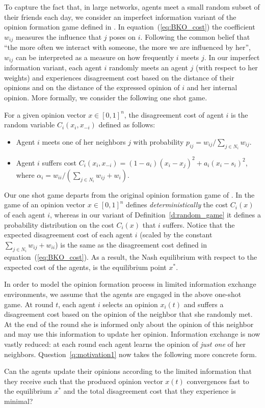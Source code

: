 To capture the fact that, in large networks, agents meet a small random subset
of their friends each day, we consider an imperfect information variant of the
opinion formation game defined in \cite{BKO11}. In equation~(\ref{eq:BKO_cost})
the coefficient $w_{ij}$ measures the influence that $j$ poses on $i$.
Following the common belief that \enquote{the more often we interact with
  someone, the more we are influenced by her}, $w_{ij}$ can be interpreted as a
measure on how frequently $i$ meets $j$. In our imperfect information variant,
each agent $i$ randomly meets an agent $j$ (with respect to her weights) and
experiences disagreement cost based on the distance of their opinions and on
the distance of the expressed opinion of $i$ and her internal opinion.  More
formally, we consider the following one shot game.
%
\begin{definition}\label{d:random_game}
  For a given opinion vector $x \in [0,1]^n$, the disagreement cost of agent
  $i$ is the random variable $C_i(x_i,x_{-i})$ defined as follows:
  \begin{itemize}
    \item Agent $i$ meets one of her neighbors $j$ with probability $p_{ij}=
      w_{ij}/\sum_{j\in N_i}w_{ij}$.
    \item Agent $i$ suffers cost $C_i(x_i , x_{-i}) = (1-a_i)(x_i-x_j)^2 +
      a_i(x_i-s_i)^2$, where $\alpha_i = w_{ii}/(\sum_{j\in N_i}w_{ij}+w_i)$.
  \end{itemize}
\end{definition}
%
Our one shot game departs from the original opinion formation game of
\cite{BKO11}.  In the game of \cite{BKO11} an opinion vector $x\in [0,1]^n$
defines \emph{deterministically} the cost $C_i(x)$ of each agent $i$, whereas
in our variant of Definition~\ref{d:random_game} it defines a probability
distribution on the cost $C_i(x)$ that $i$ suffers.  Notice that the expected
disagreement cost of each agent $i$ (scaled by the constant $\sum_{j\in
  N_i}w_{ij}+w_{ii}$) is the same as the disagreement cost defined in
equation~(\ref{eq:BKO_cost}).  As a result, the Nash equilibrium with respect
to the expected cost of the agents, is the equilibrium point $x^*$.

In order to model the opinion formation process in limited information exchange
environments, we assume that the agents are engaged in the above one-shot
game. At round $t$, each agent $i$ selects an opinion $x_i(t)$ and suffers a
disagreement cost based on the opinion of the neighbor that she randomly met.
At the end of the round she is informed only about the opinion of this neighbor
and may use this information to update her opinion. Information
exchange is now vastly reduced: at each round each agent learns the opinion of
\emph{just one} of her neighbors.  Question~\ref{q:motivation1} now takes the
following more concrete form.
%
\begin{question}\label{q:motivation2}
  Can the agents update their opinions according to the limited information
  that they receive such that the produced opinion vector $x(t)$ convergences
  fast to the equilibrium $x^*$ and the total disagreement cost that they
  experience is minimal?
\end{question}

